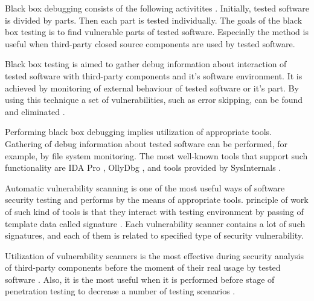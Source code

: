 
%
Black box debugging consists of the following activitites .
%
Initially, tested software is divided by parts. 
%
Then each part is tested individually. 
%
The goals of the black box testing is to find vulnerable parts of tested software. 
%
Especially the method is useful when third-party closed source components are used by tested software. 

%
Black box testing is aimed to gather debug information about interaction of tested software with third-party components and it's software environment. 
%
It is achieved by monitoring of external behaviour of tested software or it's part. 
%
By using this technique a set of vulnerabilities, such as error skipping, can be found and eliminated . 

%
Performing black box debugging implies utilization of appropriate tools. 
%
Gathering of debug information about tested software can be performed, for example, by file system monitoring. 
%
The most well-known tools that support such functionality are IDA Pro , OllyDbg , and tools provided by SysInternals . 



Automatic vulnerability scanning is one of the most useful ways of software security testing and performs by the means of appropriate tools. 
%
\The principle of work of such kind of tools is that they interact with testing environment by passing of template data called signature . 
%
Each vulnerability scanner contains a lot of such signatures, and each of them is related to specified type of security vulnerability. 

%
Utilization of vulnerability scanners is the most effective during security analysis of third-party components before the moment of their real usage by tested software . 
%
Also, it is the most useful when it is performed before stage of penetration testing to decrease a number of testing scenarios . 

